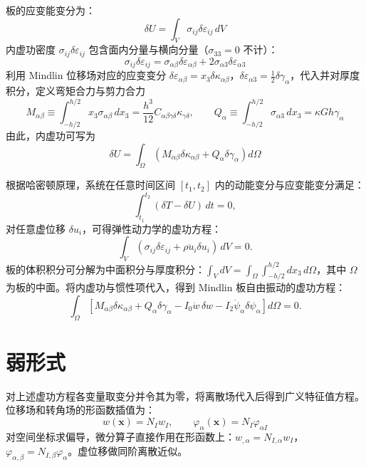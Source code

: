 板的应变能变分为：
\begin{equation}
\delta U = \int_V \sigma_{ij} \delta\varepsilon_{ij}\, dV
\end{equation}
内虚功密度 $\sigma_{ij}\delta\varepsilon_{ij}$ 包含面内分量与横向分量（$\sigma_{33}=0$ 不计）：
\begin{equation}
\sigma_{ij}\delta\varepsilon_{ij} = \sigma_{\alpha\beta}\delta\varepsilon_{\alpha\beta} + 2\sigma_{\alpha 3}\delta\varepsilon_{\alpha 3}
\end{equation}
利用 Mindlin 位移场对应的应变变分 $\delta\varepsilon_{\alpha\beta} = x_3\delta\kappa_{\alpha\beta}$，$\delta\varepsilon_{\alpha 3} = \frac{1}{2}\delta\gamma_\alpha$，代入并对厚度积分，定义弯矩合力与剪力合力
\begin{equation}
M_{\alpha\beta} \equiv \int_{-h/2}^{h/2} x_3 \sigma_{\alpha\beta}\, dx_3 = \frac{h^3}{12} C_{\alpha\beta\gamma\delta}\kappa_{\gamma\delta}, \qquad Q_\alpha \equiv \int_{-h/2}^{h/2} \sigma_{\alpha 3}\, dx_3 = \kappa G h \gamma_\alpha
\end{equation}
由此，内虚功可写为
\begin{equation}
\delta U = \int_\Omega \left(M_{\alpha\beta}\delta\kappa_{\alpha\beta} + Q_\alpha \delta\gamma_\alpha\right) d\Omega
\end{equation}

根据哈密顿原理，系统在任意时间区间 $[t_1, t_2]$ 内的动能变分与应变能变分满足：
\begin{equation}
\int_{t_1}^{t_2} (\delta T - \delta U)\, dt = 0,
\end{equation}
对任意虚位移 $\delta u_i$，可得弹性动力学的虚功方程：
\begin{equation}
\int_V (\sigma_{ij}\delta\varepsilon_{ij} + \rho \ddot{u}_i \delta u_i)\, dV = 0.
\end{equation}
板的体积积分可分解为中面积分与厚度积分：$\int_V dV = \int_\Omega \int_{-h/2}^{h/2} dx_3\, d\Omega$，其中 $\Omega$ 为板的中面。将内虚功与惯性项代入，得到 Mindlin 板自由振动的虚功方程：
\begin{equation}
\int_\Omega \left[M_{\alpha\beta}\delta\kappa_{\alpha\beta} + Q_\alpha \delta\gamma_\alpha - I_0 \ddot{w}\,\delta w - I_2 \ddot{\psi}_\alpha \delta \psi_\alpha\right] d\Omega = 0.
\end{equation}

\section{弱形式}

对上述虚功方程各变量取变分并令其为零，将离散场代入后得到广义特征值方程。位移场和转角场的形函数插值为：
\begin{equation}
w(\mathbf{x}) = N_I w_I, \qquad \varphi_\alpha(\mathbf{x}) = N_I \varphi_{\alpha I}
\end{equation}
对空间坐标求偏导，微分算子直接作用在形函数上：$w_{,\alpha} = N_{I,\alpha}w_I$，$\varphi_{\alpha,\beta} = N_{I,\beta}\varphi_\alpha$。虚位移做同阶离散近似。

